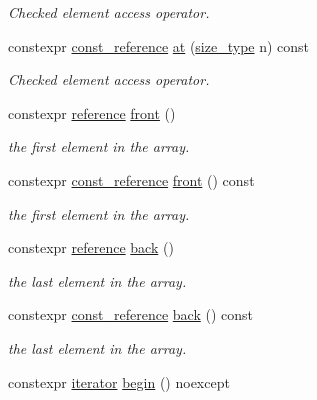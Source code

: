 \begin{DoxyCompactItemize}
\begin{DoxyCompactList}\small\item\em Checked element access operator. \end{DoxyCompactList}\item 
constexpr \hyperlink{group__Types_gaac06273bdbb48ad582528e12e76bd859}{const\-\_\-reference} \hyperlink{group__Element_ga688d9b73d4c362ca435c5274745cc5c1}{at} (\hyperlink{group__Types_ga037c76c91958f47f53bfebad4d67f8bb}{size\-\_\-type} n) const 
\begin{DoxyCompactList}\small\item\em Checked element access operator. \end{DoxyCompactList}\item 
constexpr \hyperlink{group__Types_gad3f7e8f8130d2cfb3b554c72f9f29c57}{reference} \hyperlink{group__Element_ga71e271185d26a12b8f520c082dc50f99}{front} ()
\begin{DoxyCompactList}\small\item\em the first element in the array. \end{DoxyCompactList}\item 
constexpr \hyperlink{group__Types_gaac06273bdbb48ad582528e12e76bd859}{const\-\_\-reference} \hyperlink{group__Element_ga7c6cac24de62810ca02fb7b89ae876cb}{front} () const 
\begin{DoxyCompactList}\small\item\em the first element in the array. \end{DoxyCompactList}\item 
constexpr \hyperlink{group__Types_gad3f7e8f8130d2cfb3b554c72f9f29c57}{reference} \hyperlink{group__Element_ga6ae02a1347393c160695b4b8d9ade659}{back} ()
\begin{DoxyCompactList}\small\item\em the last element in the array. \end{DoxyCompactList}\item 
constexpr \hyperlink{group__Types_gaac06273bdbb48ad582528e12e76bd859}{const\-\_\-reference} \hyperlink{group__Element_ga15f07dceab8f58a5574ff694971af13a}{back} () const 
\begin{DoxyCompactList}\small\item\em the last element in the array. \end{DoxyCompactList}\item 
constexpr \hyperlink{group__Types_ga7b1db0deafc45673f50da5aacb8c372c}{iterator} \hyperlink{group__Iterators_ga906e65071e1b075ad66d2bfa3cc33046}{begin} () noexcept

\end{DoxyCompactItemize}
